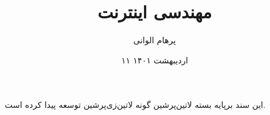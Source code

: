 \documentclass[]{article}
\title{مهندسی اینترنت}
\author{پرهام الوانی}
\date{۱۱ اردیبهشت ۱۴۰۱}
\begin{document}
  \maketitle
  \tableofcontents
  \pagebreak

  
  \begin{center}
این سند برپایه بسته ‌لاتین{‌پرشین} گونه ‌لاتین{‌زی‌پرشین} توسعه پیدا کرده است.
  \end{center}
\end{document}

